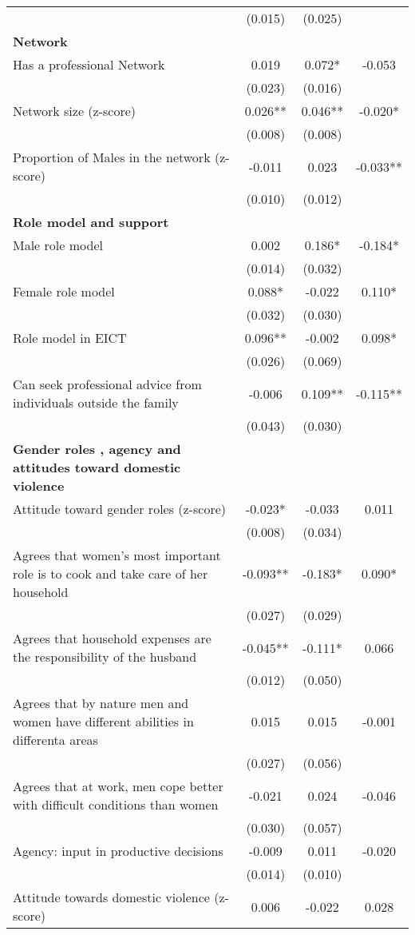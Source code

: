 \begin{longtable}{m{9cm}ccc}
&(0.015)&(0.025)&\\
\textbf{Network}&&&\\
Has a professional Network&0.019&0.072*&   -0.053\\
&(0.023)&(0.016)&\\
Network size (z-score)&0.026**&0.046**&   -0.020*\\
&(0.008)&(0.008)&\\
Proportion of Males in the network (z-score) &-0.011&0.023&   -0.033**\\
&(0.010)&(0.012)&\\
\textbf{Role model and support}&&&\\
Male role model&0.002&0.186*&   -0.184*\\
&(0.014)&(0.032)&\\
Female role model&0.088*&-0.022&    0.110*\\
&(0.032)&(0.030)&\\
Role model in EICT&0.096**&-0.002&    0.098*\\
&(0.026)&(0.069)&\\
Can seek professional advice from individuals outside the family &-0.006&0.109**&   -0.115**\\
&(0.043)&(0.030)&\\
\textbf{Gender roles , agency and attitudes toward domestic violence}&&&\\
Attitude toward gender roles (z-score)&-0.023*&-0.033&    0.011\\
&(0.008)&(0.034)&\\
Agrees that women’s most important role is to cook and take care of her household &-0.093**&-0.183*&    0.090*\\
&(0.027)&(0.029)&\\
Agrees that household expenses are the responsibility of the husband&-0.045**&-0.111*&    0.066\\
&(0.012)&(0.050)&\\
Agrees that by nature men and women have different abilities in differenta areas&0.015&0.015&   -0.001\\
&(0.027)&(0.056)&\\
Agrees that at work, men cope better with difficult conditions than women&-0.021&0.024&   -0.046\\
&(0.030)&(0.057)&\\
Agency: input in productive decisions&-0.009&0.011&   -0.020\\
&(0.014)&(0.010)&\\
Attitude towards domestic violence (z-score) &0.006&-0.022&    0.028\\

\end{longtable}
